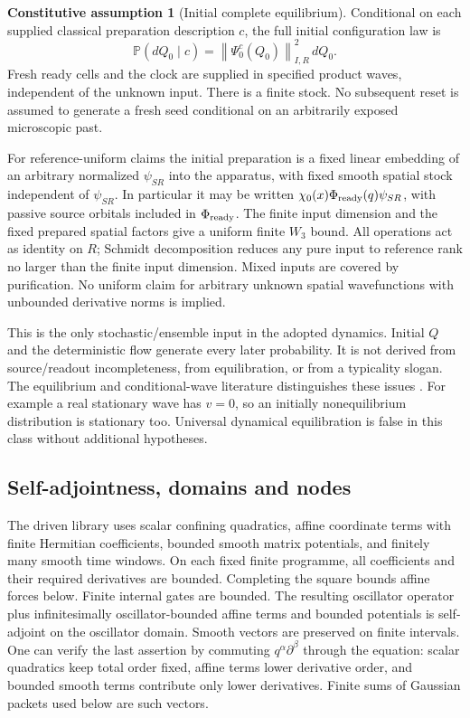 \documentclass[11pt]{article}
\theoremstyle{definition}\newtheorem{assumption}[theorem]{Constitutive assumption}
\theoremstyle{remark}\newtheorem{remark}[theorem]{Remark}
\newcommand{\Prb}{\mathbb P}\newcommand{\TV}{d_{\rm TV}}
\newcommand{\norm}[1]{\left\|#1\right\|}\newcommand{\pos}[1]{[#1]_+}
\begin{document}
\begin{assumption}[Initial complete equilibrium]\label{ax:eq}
Conditional on each supplied classical preparation description $c$, the full initial configuration law is
\begin{equation}\label{eq:equilibrium}
 \Prb(dQ_0\mid c)=\norm{\Psi_0^c(Q_0)}_{I,R}^2\,dQ_0.
\end{equation}
Fresh ready cells and the clock are supplied in specified product waves, independent of the unknown input. There is a finite stock. No subsequent reset is assumed to generate a fresh seed conditional on an arbitrarily exposed microscopic past.
\end{assumption}
For reference-uniform claims the initial preparation is a fixed linear embedding of an arbitrary normalized $\psi_{SR}$ into the apparatus, with fixed smooth spatial stock independent of $\psi_{SR}$. In particular it may be written $\chi_0(x)\Phi_{\rm ready}(q)\psi_{SR}$, with passive source orbitals included in $\Phi_{\rm ready}$. The finite input dimension and the fixed prepared spatial factors give a uniform finite $W_3$ bound. All operations act as identity on $R$; Schmidt decomposition reduces any pure input to reference rank no larger than the finite input dimension. Mixed inputs are covered by purification. No uniform claim for arbitrary unknown spatial wavefunctions with unbounded derivative norms is implied.

This is the only stochastic/ensemble input in the adopted dynamics. Initial $Q$ and the deterministic flow generate every later probability. It is not derived from source/readout incompleteness, from equilibration, or from a typicality slogan. The equilibrium and conditional-wave literature distinguishes these issues \cite{DGZeq}. For example a real stationary wave has $v=0$, so an initially nonequilibrium distribution is stationary too. Universal dynamical equilibration is false in this class without additional hypotheses.

\subsection{Self-adjointness, domains and nodes}
The driven library uses scalar confining quadratics, affine coordinate terms with finite Hermitian coefficients, bounded smooth matrix potentials, and finitely many smooth time windows. On each fixed finite programme, all coefficients and their required derivatives are bounded. Completing the square bounds affine forces below. Finite internal gates are bounded. The resulting oscillator operator plus infinitesimally oscillator-bounded affine terms and bounded potentials is self-adjoint on the oscillator domain. Smooth vectors are preserved on finite intervals. One can verify the last assertion by commuting $q^\alpha\partial^\beta$ through the equation: scalar quadratics keep total order fixed, affine terms lower derivative order, and bounded smooth terms contribute only lower derivatives. Finite sums of Gaussian packets used below are such vectors.
\end{document}
